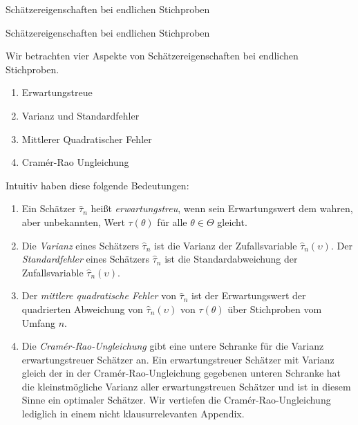 \documentclass[
  8pt,
  ignorenonframetext,
]{beamer}
\providecommand{\tightlist}{%
  \setlength{\itemsep}{0pt}\setlength{\parskip}{0pt}}
\newcommand{\ups} {\upsilon}
\begin{document}
\begin{frame}{Schätzereigenschaften bei endlichen Stichproben}
\protect\hypertarget{schuxe4tzereigenschaften-bei-endlichen-stichproben}{}
\justifying

Schätzereigenschaften bei endlichen Stichproben

\footnotesize

Wir betrachten vier Aspekte von Schätzereigenschaften bei endlichen
Stichproben.

\begin{enumerate}
[(1)]
\tightlist
\item
  Erwartungstreue
\item
  Varianz und Standardfehler
\item
  Mittlerer Quadratischer Fehler
\item
  Cramér-Rao Ungleichung
\end{enumerate}

Intuitiv haben diese folgende Bedeutungen:

\begin{enumerate}
[(1)]
\item
  \justifying Ein Schätzer \(\hat{\tau}_n\) heißt \emph{erwartungstreu},
  wenn sein Erwartungswert dem wahren, aber unbekannten, Wert
  \(\tau(\theta)\) für alle \(\theta \in \Theta\) gleicht.
\item
  Die \emph{Varianz} eines Schätzers \(\hat{\tau}_n\) ist die Varianz
  der Zufallsvariable \(\hat{\tau}_n(\ups)\). Der \emph{Standardfehler}
  eines Schätzers \(\hat{\tau}_n\) ist die Standardabweichung der
  Zufallsvariable \(\hat{\tau}_n(\ups)\).
\item
  Der \emph{mittlere quadratische Fehler} von \(\hat{\tau}_n\) ist der
  Erwartungswert der quadrierten Abweichung von \(\hat{\tau}_n(\ups)\)
  von \(\tau(\theta)\) über Stichproben vom Umfang \(n\).
\item
  Die \emph{Cramér-Rao-Ungleichung} gibt eine untere Schranke für die
  Varianz erwartungstreuer Schätzer an. Ein erwartungstreuer Schätzer
  mit Varianz gleich der in der Cramér-Rao-Ungleichung gegebenen unteren
  Schranke hat die kleinstmögliche Varianz aller erwartungstreuen
  Schätzer und ist in diesem Sinne ein optimaler Schätzer. Wir vertiefen
  die Cramér-Rao-Ungleichung lediglich in einem nicht klausurrelevanten
  Appendix.
\end{enumerate}
\end{frame}
\end{document}
